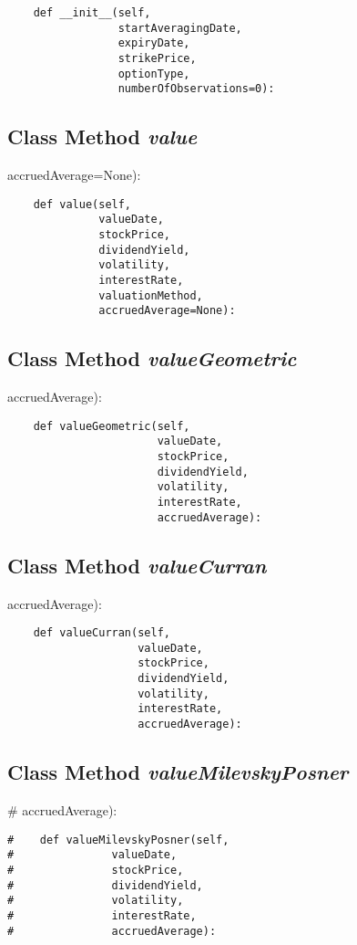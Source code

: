 \documentclass[twoside,11pt]{book}
\begin{document}
\begin{lstlisting}
    def __init__(self,
                 startAveragingDate,
                 expiryDate,
                 strikePrice,
                 optionType,
                 numberOfObservations=0):
\end{lstlisting}

\subsection{Class Method {\it value}}
accruedAverage=None):

\begin{lstlisting}
    def value(self,
              valueDate,
              stockPrice,
              dividendYield,
              volatility,
              interestRate,
              valuationMethod,
              accruedAverage=None):
\end{lstlisting}

\subsection{Class Method {\it valueGeometric}}
accruedAverage):

\begin{lstlisting}
    def valueGeometric(self,
                       valueDate,
                       stockPrice,
                       dividendYield,
                       volatility,
                       interestRate,
                       accruedAverage):
\end{lstlisting}

\subsection{Class Method {\it valueCurran}}
accruedAverage):

\begin{lstlisting}
    def valueCurran(self,
                    valueDate,
                    stockPrice,
                    dividendYield,
                    volatility,
                    interestRate,
                    accruedAverage):
\end{lstlisting}

\subsection{Class Method {\it valueMilevskyPosner}}
\#               accruedAverage):

\begin{lstlisting}
#    def valueMilevskyPosner(self,
#               valueDate,
#               stockPrice,
#               dividendYield,
#               volatility,
#               interestRate,
#               accruedAverage):
\end{lstlisting}
\end{document}

